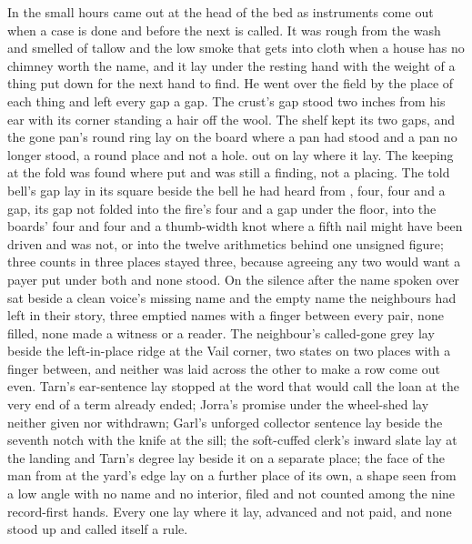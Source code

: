 In the small hours  came out at the head of the bed as instruments come out when a case is done and before the next is called. It was rough from the wash and smelled of tallow and the low smoke that gets into cloth when a house has no chimney worth the name, and it lay under the resting hand with the weight of a thing put down for the next hand to find. He went over the field by the place of each thing and left every gap a gap. The crust's gap stood two inches from his ear with its corner standing a hair off the wool. The shelf kept its two gaps, and the gone pan's round ring lay on the board where a pan had stood and a pan no longer stood, a round place and not a hole.  out on  lay where it lay. The keeping at the fold was found where put and was still a finding, not a placing. The told bell's gap lay in its square beside the bell he had heard from , four, four and a gap, its gap not folded into the fire's four and a gap under the floor, into the boards' four and four and a thumb-width knot where a fifth nail might have been driven and was not, or into the twelve arithmetics behind one unsigned figure; three counts in three places stayed three, because agreeing any two would want a payer put under both and none stood. On  the silence after the name spoken over  sat beside a clean voice's missing name and the empty name the neighbours had left in their story, three emptied names with a finger between every pair, none filled, none made a witness or a reader. The neighbour's called-gone grey lay beside the left-in-place ridge at the Vail corner, two states on two places with a finger between, and neither was laid across the other to make a row come out even. Tarn's ear-sentence lay stopped at the word that would call the loan at the very end of a term already ended; Jorra's promise under the wheel-shed lay neither given nor withdrawn; Garl's unforged collector sentence lay beside the seventh notch with the knife at the sill; the soft-cuffed clerk's inward slate lay at the landing and Tarn's degree lay beside it on a separate place; the face of the man from  at the yard's edge lay on a further place of its own, a shape seen from a low angle with no name and no interior, filed and not counted among the nine record-first hands. Every one lay where it lay, advanced and not paid, and none stood up and called itself a rule.

